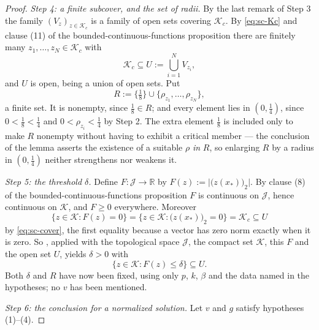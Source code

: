 \begin{proof}
\medskip\noindent\emph{Step 4: a finite subcover, and the set of radii.}
By the last remark of Step 3 the family $(V_z)_{z\in\mathcal{K}_c}$ is a family of open sets
covering $\mathcal{K}_c$.  By \eqref{eq:sc-Kc} and clause (11) of the
bounded-continuous-functions proposition there are finitely many $z_1,\ldots,z_N\in\mathcal{K}_c$
with
\begin{equation}\label{eq:sc-cover}
  \mathcal{K}_c\subseteq U:=\bigcup_{i=1}^{N}V_{z_i} ,
\end{equation}
and $U$ is open, being a union of open sets.  Put
\[
  R:=\bigl\{\tfrac18\bigr\}\cup\bigl\{\rho_{z_1},\ldots,\rho_{z_N}\bigr\} ,
\]
a finite set.  It is nonempty, since $\tfrac18\in R$; and every element lies in $(0,\tfrac14)$,
since $0<\tfrac18<\tfrac14$ and $0<\rho_{z_i}<\tfrac14$ by Step 2.  The extra element $\tfrac18$
is included only to make $R$ nonempty without having to exhibit a critical member --- the
conclusion of the lemma asserts the existence of a suitable $\rho$ \emph{in} $R$, so enlarging
$R$ by a radius in $(0,\tfrac14)$ neither strengthens nor weakens it.

\medskip\noindent\emph{Step 5: the threshold $\delta$.}
Define $F\colon\mathcal{J}\to\mathbb{R}$ by $F(z):=\bigl\lvert\bigl(z(x_\ast)\bigr)_2\bigr\rvert$.
By clause (8) of the bounded-continuous-functions proposition $F$ is continuous on
$\mathcal{J}$, hence continuous on $\mathcal{K}$, and $F\ge0$ everywhere.  Moreover
\[
  \{z\in\mathcal{K}:F(z)=0\}
  =\bigl\{z\in\mathcal{K}:\bigl(z(x_\ast)\bigr)_2=0\bigr\}=\mathcal{K}_c\subseteq U
\]
by \eqref{eq:sc-cover}, the first equality because a vector has zero norm exactly when it is
zero.  So , applied with the topological space $\mathcal{J}$, the compact
set $\mathcal{K}$, this $F$ and the open set $U$, yields $\delta>0$ with
\begin{equation}\label{eq:sc-delta}
  \{z\in\mathcal{K}:F(z)\le\delta\}\subseteq U .
\end{equation}
Both $\delta$ and $R$ have now been fixed, using only $p$, $k$, $\beta$ and the data named in
the hypotheses; no $v$ has been mentioned.

\medskip\noindent\emph{Step 6: the conclusion for a normalized solution.}
Let $v$ and $g$ satisfy hypotheses (1)--(4).


\end{proof}

